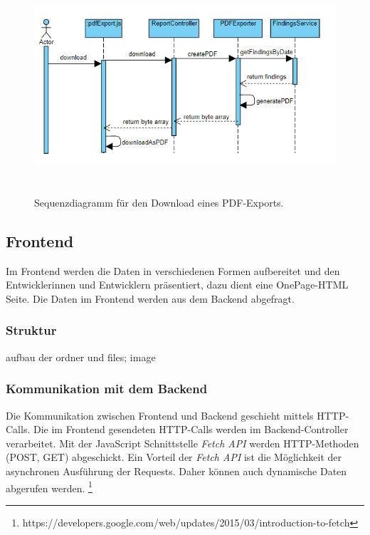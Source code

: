 \begin{figure}[tp]
  \centering
  \includegraphics[height=8cm]{images/seqGeneratePdf.PNG}
 \caption[Sequenzdiagramm für den Download eines PDF-Exports]{Sequenzdiagramm für den Download eines PDF-Exports.}
  \label{fig:engine}
\end{figure}

\subsection{Frontend}
Im Frontend werden die Daten in verschiedenen Formen aufbereitet und den Entwicklerinnen und Entwicklern präsentiert, dazu dient eine OnePage-HTML Seite. Die Daten im Frontend werden aus dem Backend abgefragt.
\subsubsection{Struktur}
aufbau der ordner und files; image
\subsubsection{Kommunikation mit dem Backend}
Die Kommunikation zwischen Frontend und Backend geschieht mittels HTTP-Calls. Die im Frontend gesendeten HTTP-Calls werden im Backend-Controller verarbeitet.  Mit der JavaScript Schnittstelle \textit{Fetch API} werden HTTP-Methoden (POST, GET) abgeschickt. Ein Vorteil der  \textit{Fetch API} ist die Möglichkeit der asynchronen Ausführung der Requests. Daher können auch dynamische Daten abgerufen werden. \footnote{https://developers.google.com/web/updates/2015/03/introduction-to-fetch}
\lstset{
  caption={Erstellung eines GET-Request für Projektdaten mit der Schnittstelle Fetch API.}, 
  basicstyle=\small\ttfamily, 
  label=lst:fetchApiGet, 
  language=Java,
  frame=single,
  breaklines=true, %
  postbreak=\mbox{\textcolor{red}{$\hookrightarrow$}\space},
}

